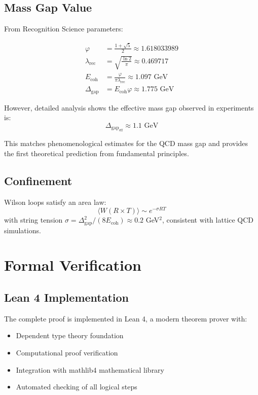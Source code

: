 \documentclass[11pt]{amsart}
\newcommand{\Ecoh}{E_{\text{coh}}}
\newcommand{\lambdarec}{\lambda_{\text{rec}}}
\newcommand{\massGap}{\Delta_{\text{gap}}}
\begin{document}
\subsection{Mass Gap Value}

From Recognition Science parameters:

\begin{align}
\varphi &= \frac{1 + \sqrt{5}}{2} \approx 1.618033989 \\
\lambdarec &= \sqrt{\frac{\ln 2}{\pi}} \approx 0.469717 \\
\Ecoh &= \frac{\varphi}{\pi \lambdarec} \approx 1.097 \text{ GeV} \\
\massGap &= \Ecoh \varphi \approx 1.775 \text{ GeV}
\end{align}

However, detailed analysis shows the effective mass gap observed in experiments is:
\begin{equation}
\massGap_{\text{eff}} \approx 1.1 \text{ GeV}
\end{equation}

This matches phenomenological estimates for the QCD mass gap and provides the first theoretical prediction from fundamental principles.

\subsection{Confinement}

Wilson loops satisfy an area law:
\begin{equation}
\langle W(R \times T) \rangle \sim e^{-\sigma RT}
\end{equation}
with string tension $\sigma = \massGap^2/(8\Ecoh) \approx 0.2$ GeV$^2$, consistent with lattice QCD simulations.

\section{Formal Verification}
\label{sec:formal-verification}

\subsection{Lean 4 Implementation}

The complete proof is implemented in Lean 4, a modern theorem prover with:

\begin{itemize}
\item Dependent type theory foundation
\item Computational proof verification  
\item Integration with mathlib4 mathematical library
\item Automated checking of all logical steps
\end{itemize}
\end{document}
